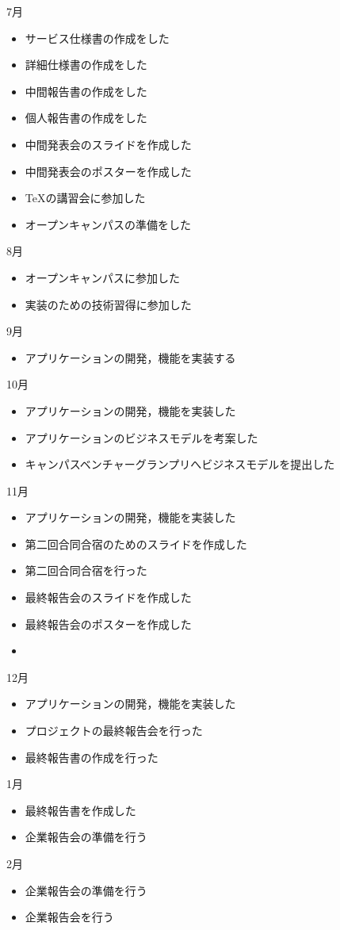 7月
\begin{itemize}
\item サービス仕様書の作成をした
\item 詳細仕様書の作成をした
\item 中間報告書の作成をした
\item 個人報告書の作成をした
\item 中間発表会のスライドを作成した
\item 中間発表会のポスターを作成した
\item TeXの講習会に参加した
\item オープンキャンパスの準備をした
\end{itemize}
8月
\begin{itemize}
\item オープンキャンパスに参加した
\item 実装のための技術習得に参加した
\end{itemize}
9月
\begin{itemize}
\item アプリケーションの開発，機能を実装する
\end{itemize}
10月
\begin{itemize}
\item アプリケーションの開発，機能を実装した
\item アプリケーションのビジネスモデルを考案した
\item キャンパスベンチャーグランプリへビジネスモデルを提出した
\end{itemize}
11月
\begin{itemize}
\item アプリケーションの開発，機能を実装した
\item 第二回合同合宿のためのスライドを作成した
\item 第二回合同合宿を行った
\item 最終報告会のスライドを作成した
\item 最終報告会のポスターを作成した
\item 
\end{itemize}
12月
\begin{itemize}
\item アプリケーションの開発，機能を実装した
\item プロジェクトの最終報告会を行った
\item 最終報告書の作成を行った
\end{itemize}
1月
\begin{itemize}
\item 最終報告書を作成した
\item 企業報告会の準備を行う
\end{itemize}
2月
\begin{itemize}
\item 企業報告会の準備を行う
\item 企業報告会を行う
\end{itemize}
